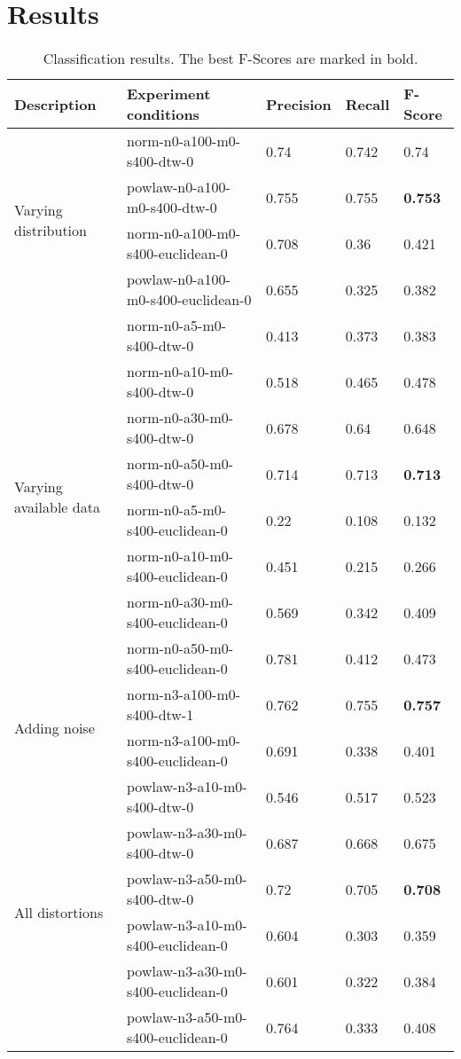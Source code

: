 \documentclass[10pt]{article}
\begin{document}
	\section{Results}
	\begin{table}[ht!]
	\centering
	\begin{tabular}{|l|l|lll|}
		\hline Description & Experiment conditions & Precision & Recall & F-Score \\ \hline 
		\multirow{4}{*}{Varying distribution} 
		& norm-n0-a100-m0-s400-dtw-0 & 0.74 & 0.742 & 0.74\\ 
		& powlaw-n0-a100-m0-s400-dtw-0 & 0.755 & 0.755 & \textbf{0.753}\\ 
		& norm-n0-a100-m0-s400-euclidean-0 & 0.708 & 0.36 & 0.421\\ 
		& powlaw-n0-a100-m0-s400-euclidean-0 & 0.655 & 0.325 & 0.382\\ \hline
		
		\multirow{8}{*}{Varying available data}
		& norm-n0-a5-m0-s400-dtw-0 & 0.413 & 0.373 & 0.383\\ 
		& norm-n0-a10-m0-s400-dtw-0 & 0.518 & 0.465 & 0.478\\ 
		& norm-n0-a30-m0-s400-dtw-0 & 0.678 & 0.64 & 0.648\\ 
		& norm-n0-a50-m0-s400-dtw-0 & 0.714 & 0.713 & \textbf{0.713}\\ 
		& norm-n0-a5-m0-s400-euclidean-0 & 0.22 & 0.108 & 0.132\\ 
		& norm-n0-a10-m0-s400-euclidean-0 & 0.451 & 0.215 & 0.266\\ 
		& norm-n0-a30-m0-s400-euclidean-0 & 0.569 & 0.342 & 0.409\\ 
		& norm-n0-a50-m0-s400-euclidean-0 & 0.781 & 0.412 & 0.473\\ \hline
		
		\multirow{2}{*}{Adding noise}
		& norm-n3-a100-m0-s400-dtw-1 & 0.762 & 0.755 & \textbf{0.757}\\ 
		& norm-n3-a100-m0-s400-euclidean-0 & 0.691 & 0.338 & 0.401\\ \hline
		
		\multirow{6}{*}{All distortions}
		& powlaw-n3-a10-m0-s400-dtw-0 & 0.546 & 0.517 & 0.523\\ 
		& powlaw-n3-a30-m0-s400-dtw-0 & 0.687 & 0.668 & 0.675\\ 
		& powlaw-n3-a50-m0-s400-dtw-0 & 0.72 & 0.705 & \textbf{0.708}\\ 
		& powlaw-n3-a10-m0-s400-euclidean-0 & 0.604 & 0.303 & 0.359\\ 
		& powlaw-n3-a30-m0-s400-euclidean-0 & 0.601 & 0.322 & 0.384\\ 
		& powlaw-n3-a50-m0-s400-euclidean-0 & 0.764 & 0.333 & 0.408\\ \hline
	\end{tabular}
	\caption{Classification results. The best F-Scores are marked in bold.}
	\end{table}
		
\end{document}
